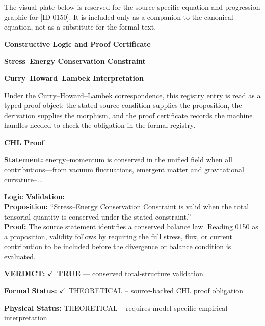 \begingroup\footnotesize\sloppy
The visual plate below is reserved for the source-specific equation and progression graphic for [ID 0150]. It is included only as a companion to the canonical equation, not as a substitute for the formal text.
\par\endgroup
\ifTZPDarkEdition
{}
\fi

\clearpage
\begingroup\tzpsupportsetup
\noindent\textbf{\fontsize{10.8pt}{12.8pt}\selectfont [ID 0150] Constructive Logic and Proof Certificate}\par
\noindent\textbf{\fontsize{10pt}{12pt}\selectfont Stress--Energy Conservation Constraint}\par
\vspace{0.45em}
\begingroup
\footnotesize
\setlength{\parskip}{0.22em}
\setlength{\parindent}{0pt}
\noindent\textbf{Curry--Howard--Lambek Interpretation}\par
Under the Curry--Howard--Lambek correspondence, this registry entry is read as a typed proof
object: the stated source condition supplies the proposition, the derivation supplies the
morphism, and the proof certificate records the machine handles needed to check the obligation
in the formal registry.

\vspace{0.45em}
\noindent\textbf{CHL Proof}\par
\textbf{Statement:} energy--momentum is conserved in the unified field when all contributions---from vacuum
fluctuations, emergent matter and gravitational curvature--...

\textbf{Logic Validation:}\\
\textbf{Proposition:} ``Stress--Energy Conservation Constraint is valid when the total tensorial quantity is
conserved under the stated constraint.''\\
\textbf{Proof:} The source statement identifies a conserved balance law. Reading 0150 as a proposition,
validity follows by requiring the full stress, flux, or current contribution to be
included before the divergence or balance condition is evaluated.

\textbf{VERDICT:} \ensuremath{\checkmark}\ \textbf{TRUE} --- conserved total-structure validation

\textbf{Formal Status:} \ensuremath{\checkmark}\ THEORETICAL -- source-backed CHL proof obligation

\textbf{Physical Status:} THEORETICAL -- requires model-specific empirical interpretation
\par\vspace{0.45em}
\par
\ifTZPDarkEdition
{}
\fi
\endgroup
\endgroup
